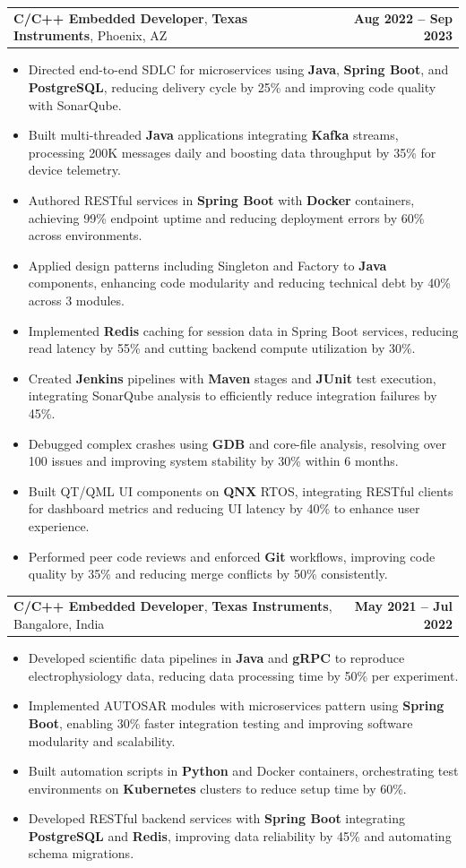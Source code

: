 \documentclass[letterpaper,11pt]{article}
\makeatletter
\newcommand{\resumeItem}[1]{
  \item\footnotesize{
    {#1 \vspace{-2pt}}
  }
}
\newcommand{\resumeSubheading}[4]{
  \vspace{-2pt}\item
    \begin{tabular*}{1.0\textwidth}[t]{l@{\extracolsep{\fill}}r}
      \textbf{\fontsize{10pt}{14pt}\selectfont #3}, \textbf{\fontsize{10pt}{14pt}\selectfont #1}, \fontsize{10pt}{14pt}\selectfont #4 & \textbf{\fontsize{10pt}{14pt}\selectfont #2} \\
    \end{tabular*}\vspace{-7pt}
}
\newcommand{\resumeItemListStart}{\begin{itemize}[leftmargin=*]}
\newcommand{\resumeItemListEnd}{\end{itemize}\vspace{-5pt}}
\makeatother
\begin{document}
    \resumeSubheading
        {Texas Instruments}{Aug 2022 -- Sep 2023}
        {C/C++ Embedded Developer}{Phoenix, AZ}
      \resumeItemListStart
        \resumeItem{Directed end-to-end SDLC for microservices using \textbf{Java}, \textbf{Spring Boot}, and \textbf{PostgreSQL}, reducing delivery cycle by 25\% and improving code quality with SonarQube.}
        \resumeItem{Built multi-threaded \textbf{Java} applications integrating \textbf{Kafka} streams, processing 200K messages daily and boosting data throughput by 35\% for device telemetry.}
        \resumeItem{Authored RESTful services in \textbf{Spring Boot} with \textbf{Docker} containers, achieving 99\% endpoint uptime and reducing deployment errors by 60\% across environments.}
        \resumeItem{Applied design patterns including Singleton and Factory to \textbf{Java} components, enhancing code modularity and reducing technical debt by 40\% across 3 modules.}
        \resumeItem{Implemented \textbf{Redis} caching for session data in Spring Boot services, reducing read latency by 55\% and cutting backend compute utilization by 30\%.}
        \resumeItem{Created \textbf{Jenkins} pipelines with \textbf{Maven} stages and \textbf{JUnit} test execution, integrating SonarQube analysis to efficiently reduce integration failures by 45\%.}
        \resumeItem{Debugged complex crashes using \textbf{GDB} and core-file analysis, resolving over 100 issues and improving system stability by 30\% within 6 months.}
        \resumeItem{Built QT/QML UI components on \textbf{QNX} RTOS, integrating RESTful clients for dashboard metrics and reducing UI latency by 40\% to enhance user experience.}
        \resumeItem{Performed peer code reviews and enforced \textbf{Git} workflows, improving code quality by 35\% and reducing merge conflicts by 50\% consistently.}
      \resumeItemListEnd

    \resumeSubheading
        {Texas Instruments}{May 2021 -- Jul 2022}
        {C/C++ Embedded Developer}{Bangalore, India}
      \resumeItemListStart
        \resumeItem{Developed scientific data pipelines in \textbf{Java} and \textbf{gRPC} to reproduce electrophysiology data, reducing data processing time by 50\% per experiment.}
        \resumeItem{Implemented AUTOSAR modules with microservices pattern using \textbf{Spring Boot}, enabling 30\% faster integration testing and improving software modularity and scalability.}
        \resumeItem{Built automation scripts in \textbf{Python} and Docker containers, orchestrating test environments on \textbf{Kubernetes} clusters to reduce setup time by 60\%.}
        \resumeItem{Developed RESTful backend services with \textbf{Spring Boot} integrating \textbf{PostgreSQL} and \textbf{Redis}, improving data reliability by 45\% and automating schema migrations.}
      \resumeItemListEnd
\end{document}
